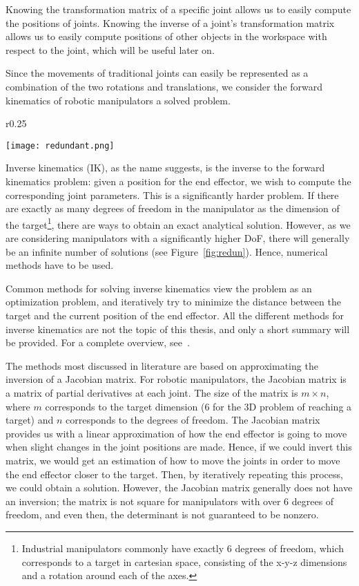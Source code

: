 Knowing the transformation matrix of a specific joint allows us to easily compute the positions of joints. Knowing the inverse of a joint's transformation matrix allows us to easily compute positions of other objects in the workspace with respect to the joint, which will be useful later on.

Since the movements of traditional joints can easily be represented as a combination of the two rotations and translations, we consider the forward kinematics of robotic manipulators a solved problem.

\newpage

\begin{wrapfigure}{r}{0.25\textwidth}
    \centering
    \begin{minipage}{.25\textwidth}
        \texttt{[image: redundant.png]}
    \end{minipage}
    \caption{\\3 example IK solutions to the same problem~\cite{Ondika2021thesis}}\label{fig:redun}
\end{wrapfigure}

Inverse kinematics (IK), as the name suggests, is the inverse to the forward kinematics problem: given a position for the end effector, we wish to compute the corresponding joint parameters. This is a significantly harder problem. If there are exactly as many degrees of freedom in the manipulator as the dimension of the target\footnote{Industrial manipulators commonly have exactly 6 degrees of freedom, which corresponds to a target in cartesian space, consisting of the x-y-z dimensions and a rotation around each of the axes.}, there are ways to obtain an exact analytical solution. However, as we are considering manipulators with a significantly higher DoF, there will generally be an infinite number of solutions (see Figure~\ref{fig:redun}). Hence, numerical methods have to be used.

Common methods for solving inverse kinematics view the problem as an optimization problem, and iteratively try to minimize the distance between the target and the current position of the end effector. All the different methods for inverse kinematics are not the topic of this thesis, and only a short summary will be provided. For a complete overview, see~\cite{overview}.

The methods most discussed in literature are based on approximating the inversion of a Jacobian matrix. For robotic manipulators, the Jacobian matrix is a matrix of partial derivatives at each joint. The size of the matrix is $m \times n$, where $m$ corresponds to the target dimension (6 for the 3D problem of reaching a target) and $n$ corresponds to the degrees of freedom.
The Jacobian matrix provides us with a linear approximation of how the end effector is going to move when slight changes in the joint positions are made. Hence, if we could invert this matrix, we would get an estimation of how to move the joints in order to move the end effector closer to the target. Then, by iteratively repeating this process, we could obtain a solution. However, the Jacobian matrix generally does not have an inversion; the matrix is not square for manipulators with over 6 degrees of freedom, and even then, the determinant is not guaranteed to be nonzero.

